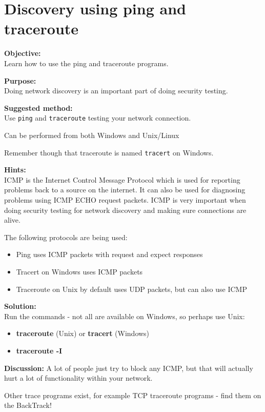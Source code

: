 \documentclass[a4paper,11pt,notitlepage]{report}
\begin{document}
\chapter{Discovery using ping and traceroute}
\label{ex:ping}

{\bf Objective:}\\
Learn how to use the ping and traceroute programs.

{\bf Purpose:}\\
Doing network discovery is an important part of doing security testing.

{\bf Suggested method:} \\
Use \verb+ping+ and \verb+traceroute+ testing your network connection.

Can be performed from both Windows and Unix/Linux

Remember though that traceroute is named \verb+tracert+ on Windows.

{\bf Hints:} \\
ICMP is the Internet Control Message Protocol which is used for reporting problems back to a source on the internet. It can also be used for diagnosing problems using ICMP ECHO request packets. ICMP is very important when doing security testing for network discovery and making sure connections are alive.

The following protocols are being used:
\begin{itemize}
\item Ping uses ICMP packets with request and expect responses
\item Tracert on Windows uses ICMP packets
\item Traceroute on Unix by default uses UDP packets, but can also use ICMP
\end{itemize}

{\bf Solution:}\\
Run the commands - not all are available on Windows, so perhaps use Unix:
\begin{itemize}
\item {\bf traceroute} (Unix) or {\bf tracert} (Windows)
\item {\bf traceroute -I}\\
\end{itemize}

{\bf Discussion:}
A lot of people just try to block any ICMP, but that will actually hurt a lot of functionality within your network.

Other trace programs exist, for example TCP traceroute programs - find them on the BackTrack!
\end{document}
